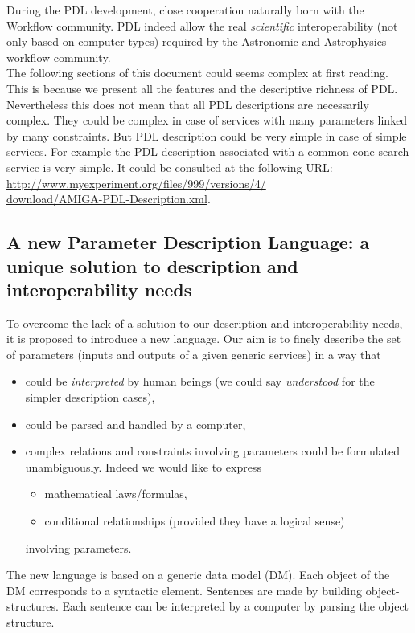 \documentclass[a4paper,11pt] {ivoa}
\begin{document}
\noindent During the PDL development, close cooperation naturally born with the Workflow community. PDL indeed allow the real {\it scientific} interoperability (not only based on computer types) required by the Astronomic and Astrophysics workflow community.\\

\noindent The following sections of this document could seems complex at first reading. This is because we present all the features and the descriptive richness  of PDL. Nevertheless this does  not mean that all PDL descriptions are necessarily complex. They could be complex in case of services with many parameters linked by many constraints. But PDL description could be very simple in case of simple services. 
For example the PDL description associated with a common cone search service is very simple. It could be consulted at the following URL:\\

\noindent \href{
http://www.myexperiment.org/files/999/versions/4/download/AMIGA-PDL-Description.xml
}{http://www.myexperiment.org/files/999/versions/4/\\download/AMIGA-PDL-Description.xml}.

\subsection{A new Parameter Description Language: a unique solution to description and interoperability needs}
To overcome the lack of a solution to our description and interoperability
needs, it is proposed to introduce a new language.
Our aim is to finely describe the set of parameters (inputs and outputs of a given generic services)
in a way that
\begin{itemize}
\item could be {\it interpreted} by human beings (we could say {\it understood} for the simpler description cases),
\item could be parsed and handled by a computer,
\item complex relations and constraints involving parameters could be formulated unambiguously.
Indeed we would like to express
\begin{itemize}
\item mathematical laws/formulas,
\item conditional relationships (provided they have a logical sense)
\end{itemize}
involving parameters.
\end{itemize}
The new language is based on a generic data model (DM). Each object of the DM corresponds to a
syntactic element. Sentences are made by building object-structures.
Each sentence can be interpreted by a computer by parsing the object structure.\\
\end{document}
